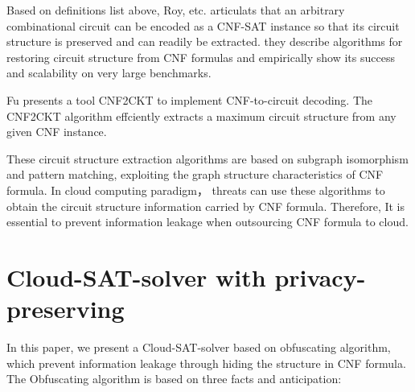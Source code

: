 \documentclass[runningheads,a4paper]{llncs}
\begin{document}
Based on definitions list above, Roy, etc.\cite{t8} articulats that an arbitrary combinational circuit can be encoded as a CNF-SAT instance 
so that its circuit structure is preserved and can readily be extracted. 
they describe algorithms for restoring circuit structure from CNF formulas 
and empirically show its success and scalability on very large benchmarks. 
% 
% 
% 
% 

Fu\cite{t9} presents a tool CNF2CKT to implement CNF-to-circuit decoding. The CNF2CKT algorithm effciently extracts a maximum circuit structure from any given CNF instance. 


% 

These circuit structure extraction algorithms are based on subgraph isomorphism and pattern matching, 
exploiting the graph structure characteristics of CNF formula. In cloud computing paradigm，
threats can use these algorithms to obtain the circuit structure information carried by CNF formula.
Therefore, It is essential to prevent information leakage when outsourcing CNF formula to cloud.

\section{Cloud-SAT-solver with privacy-preserving}

In this paper, we present a Cloud-SAT-solver based on obfuscating algorithm, which prevent information leakage through hiding the structure in CNF formula.
The Obfuscating algorithm is based on three facts and anticipation:
\end{document}
